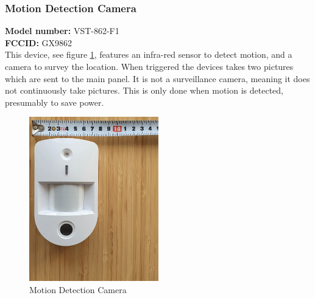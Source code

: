\subsubsection{Motion Detection Camera}
\textbf{Model number:} VST-862-F1 \\
\textbf{FCCID:} GX9862 \\
This device, see figure \ref{fig:motion-camera}, features an infra-red sensor to detect motion, and a camera to survey the location. When triggered the devices takes two pictures which are sent to the main panel. It is not a surveillance camera, meaning it does not continuously take pictures. This is only done when motion is detected, presumably to save power.
\begin{figure}[!ht]
  \begin{center}
    \includegraphics[width=0.5\textwidth]{images/camera.png}
  \end{center}
  \caption{Motion Detection Camera}
  \label{fig:motion-camera}
\end{figure}

